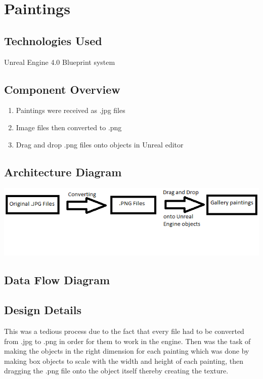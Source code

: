 


\section{Paintings }

\subsection{Technologies  Used}
Unreal Engine 4.0 Blueprint system

\subsection{Component  Overview}
\begin{enumerate}
\item Paintings were received as .jpg files
\item Image files then converted to .png
\item Drag and drop .png files onto objects in Unreal editor
\end{enumerate}


\subsection{ Architecture  Diagram}
\includegraphics[scale=1.0]{Diagrams/PictureDiagram.png}
 
\subsection{Data Flow Diagram}


\subsection{Design Details}
This was a tedious process due to the fact that every file had to be converted from .jpg to .png in order for them to work in the engine.  Then was the task of making the objects in the right dimension for each painting which was done by making box objects to scale with the width and height of each painting, then dragging the .png file onto the object itself thereby creating the texture.


